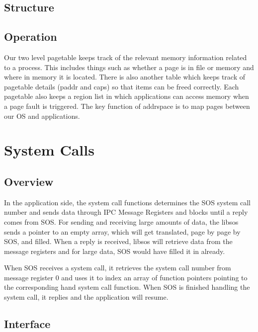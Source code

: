 \documentclass[12pt]{article}
\begin{document}
\subsection{Structure}
\subsection{Operation}
Our two level pagetable keeps track of the relevant memory information related to a process. This includes things such as whether a page is in file or memory and where in memory it is located. There is also another table which keeps track of pagetable details (paddr and caps) so that items can be freed correctly. Each pagetable also keeps a region list in which applications can access memory when a page fault is triggered. 
The key function of addrspace is to map pages between our OS and applications.

\clearpage
\section{System Calls}
\subsection{Overview}
In the application side, the system call functions determines the SOS system call number and sends data through IPC Message Registers and blocks until a reply comes from SOS. For sending and receiving large amounts of data, the libsos sends a pointer to an empty array, which will get translated, page by page by SOS, and filled. When a reply is received, libsos will retrieve data from the message registers and for large data, SOS would have filled it in already.

When SOS receives a system call, it retrieves the system call number from message register 0 and uses it to index an array of function pointers pointing to the corresponding hand system call function. When SOS is finished handling the system call, it replies and the application will resume.
\subsection{Interface}
\end{document}
